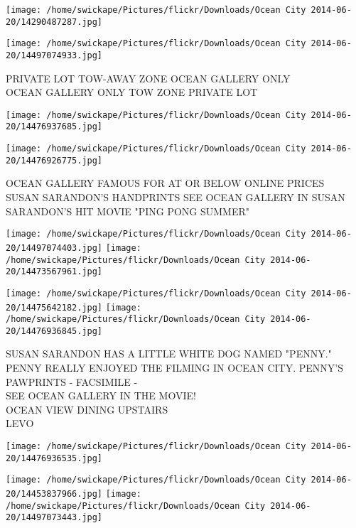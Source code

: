 \documentclass[10pt,letterpaper]{article}
\begin{document}
\texttt{[image: /home/swickape/Pictures/flickr/Downloads/Ocean City 2014-06-20/14290487287.jpg]}

\vspace{0.25in}
\texttt{[image: /home/swickape/Pictures/flickr/Downloads/Ocean City 2014-06-20/14497074933.jpg]}

PRIVATE LOT TOW{-}AWAY ZONE OCEAN GALLERY ONLY\\
OCEAN GALLERY ONLY TOW ZONE PRIVATE LOT\\
\pagebreak

\texttt{[image: /home/swickape/Pictures/flickr/Downloads/Ocean City 2014-06-20/14476937685.jpg]}

\vspace{0.25in}
\texttt{[image: /home/swickape/Pictures/flickr/Downloads/Ocean City 2014-06-20/14476926775.jpg]}

OCEAN GALLERY FAMOUS FOR AT OR BELOW ONLINE PRICES\\
SUSAN SARANDON'S HANDPRINTS SEE OCEAN GALLERY IN SUSAN SARANDON'S HIT MOVIE "PING PONG SUMMER"\\
\pagebreak

\texttt{[image: /home/swickape/Pictures/flickr/Downloads/Ocean City 2014-06-20/14497074403.jpg]}
\texttt{[image: /home/swickape/Pictures/flickr/Downloads/Ocean City 2014-06-20/14473567961.jpg]}

\texttt{[image: /home/swickape/Pictures/flickr/Downloads/Ocean City 2014-06-20/14475642182.jpg]}
\texttt{[image: /home/swickape/Pictures/flickr/Downloads/Ocean City 2014-06-20/14476936845.jpg]}

SUSAN SARANDON HAS A LITTLE WHITE DOG NAMED "PENNY."  PENNY REALLY ENJOYED THE FILMING IN OCEAN CITY.  PENNY'S PAWPRINTS {-} FACSIMILE {-}\\
SEE OCEAN GALLERY IN THE MOVIE!\\
OCEAN VIEW DINING UPSTAIRS\\
LEVO\\
\pagebreak

\texttt{[image: /home/swickape/Pictures/flickr/Downloads/Ocean City 2014-06-20/14476936535.jpg]}

\vspace{0.25in}
\texttt{[image: /home/swickape/Pictures/flickr/Downloads/Ocean City 2014-06-20/14453837966.jpg]}
\texttt{[image: /home/swickape/Pictures/flickr/Downloads/Ocean City 2014-06-20/14497073443.jpg]}
\end{document}
